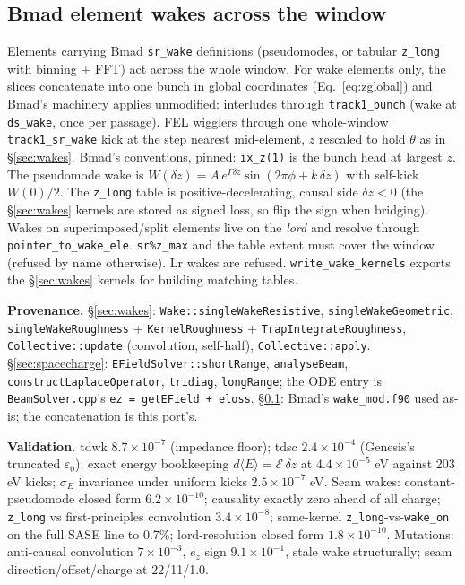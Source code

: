 \documentclass[11pt]{article}
\newcommand{\code}[1]{\texttt{#1}}
\newenvironment{provenance}{\par\small\textbf{Provenance.}}{\par}
\newenvironment{validation}{\par\small\textbf{Validation.}}{\par}
\begin{document}
\subsection{Bmad element wakes across the window}\label{sec:seamwake}

Elements carrying Bmad \code{sr\_wake} definitions (pseudomodes, or tabular
\code{z\_long} with binning + FFT) act across the whole window. For wake elements only,
the slices concatenate into one bunch in global coordinates (Eq.~\ref{eq:zglobal}) and
Bmad's machinery applies unmodified: interludes through \code{track1\_bunch} (wake
at \code{ds\_wake}, once per passage). FEL wigglers through one whole-window
\code{track1\_sr\_wake} kick at the step nearest mid-element, $z$ rescaled to hold
$\theta$ as in \S\ref{sec:wakes}. Bmad's conventions, pinned: \code{ix\_z(1)} is the
bunch head at largest $z$. The pseudomode wake is $W(\delta z) = A\,e^{\Gamma\delta z}
\sin(2\pi\phi + k\,\delta z)$ with self-kick $W(0)/2$. The \code{z\_long} table is
positive-decelerating, causal side $\delta z<0$ (the \S\ref{sec:wakes} kernels are
stored as signed loss, so flip the sign when bridging). Wakes on superimposed/split
elements live on the \emph{lord} and resolve through \code{pointer\_to\_wake\_ele}.
\code{sr\%z\_max} and the table extent must cover the window (refused by name
otherwise). Lr wakes are refused. \code{write\_wake\_kernels} exports the
\S\ref{sec:wakes} kernels for building matching tables.

\begin{provenance}
\S\ref{sec:wakes}: \code{Wake::singleWakeResistive}, \code{singleWakeGeometric},
\code{singleWakeRoughness} + \code{KernelRoughness} + \code{TrapIntegrateRoughness},
\code{Collective::update} (convolution, self-half), \code{Collective::apply}.
\S\ref{sec:spacecharge}: \code{EFieldSolver::shortRange}, \code{analyseBeam},
\code{constructLaplaceOperator}, \code{tridiag}, \code{longRange}; the ODE entry is
\code{BeamSolver.cpp}'s \code{ez = getEField + eloss}. \S\ref{sec:seamwake}: Bmad's
\code{wake\_mod.f90} used as-is; the concatenation is this port's.
\end{provenance}
\begin{validation}
tdwk $8.7\times10^{-7}$ (impedance floor); tdsc $2.4\times10^{-4}$ (Genesis's
truncated $\varepsilon_0$); exact energy bookkeeping $d\langle E\rangle =
\mathcal{E}\,\delta z$ at $4.4\times10^{-5}$ eV against 203 eV kicks;
$\sigma_E$ invariance under uniform kicks $2.5\times10^{-7}$ eV. Seam wakes:
constant-pseudomode closed form $6.2\times10^{-10}$; causality exactly zero ahead of
all charge; \code{z\_long} vs first-principles convolution $3.4\times10^{-8}$;
same-kernel \code{z\_long}-vs-\code{wake\_on} on the full SASE line to 0.7\%;
lord-resolution closed form $1.8\times10^{-10}$. Mutations: anti-causal convolution
$7\times10^{-3}$, $e_z$ sign $9.1\times10^{-1}$, stale wake structurally; seam
direction/offset/charge at 22/11/1.0.
\end{validation}
\end{document}
